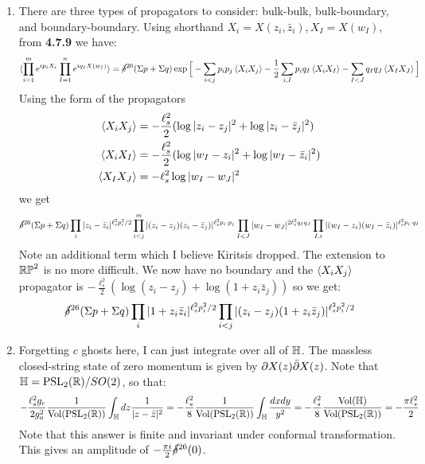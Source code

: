 \documentclass[11pt, class=article, crop=false]{standalone}
\begin{document}
\begin{enumerate}
	\item There are three types of propagators to consider: bulk-bulk, bulk-boundary, and boundary-boundary. Using shorthand $X_i = X(z_i, \bar z_i), X_I = X(w_I)$, from \textbf{4.7.9} we have:
	\[
	\begin{aligned}
		\braket{\prod_{i=1}^m e^{i p_i X_i} \prod_{I=1}^n e^{i q_I X(w_I)}} &= \cancel\delta^{26} (\Sigma p + \Sigma q) \exp\Big[- \sum_{i<j} p_i p_j \braket{X_i X_j} - \frac12 \sum_{i, I} p_i q_I \braket{X_i X_I} - \sum_{I<J} q_I q_J \braket{X_I X_J} \Big]\\
	\end{aligned}
	\]
	Using the form of the propagators 
	\[
		\begin{aligned}
			\braket{X_i X_j} &= -\frac{\ell_s^2}{2} (\log |z_i - z_j|^2 + \log |z_i - \bar z_j|^2 )\\
			\braket{X_i X_I} &=  -\frac{\ell_s^2}{2} (\log |w_I-z_i|^2 + \log |w_I-\bar z_i|^2)\\
			\braket{X_I X_J} &= -\ell_s^2 \log|w_I-w_J|^2
		\end{aligned}
	\]
	we get
	\[
		\cancel\delta^{26} (\Sigma p + \Sigma q) \prod_{i} |z_i - \bar z_i|^{\ell_s^2 p_i^2/2} \prod_{i<j}^m |(z_i - z_j) (z_i - \bar z_j)|^{\ell_s^2 p_i \cdot p_j} \prod_{I<J} |w_I - w_J|^{2 \ell_s^2 q_I q_J} \prod_{I, i} |(w_I - z_i) (w_I- \bar z_i)|^{\ell_s^2 p_i \cdot q_I}
	\]
	Note an additional term which I believe Kiritsis dropped. The extension to $\mathbb{RP}^2$ is no more difficult. We now have no boundary and the $\braket{X_i X_j}$ propagator is $-\frac{\ell_s^2}{2} (\log(z_i - z_j) + \log(1+z_i \bar z_j))$ so we get:
	\[
		\cancel\delta^{26} (\Sigma p + \Sigma q) \prod_{i} |1 + z_i \bar z_i|^{\ell_s^2 p_i^2/2} \prod_{i < j} |(z_i - z_j) (1 + z_i \bar z_j)|^{\ell_s^2 p_i^2/2}
	\]
	
	\item Forgetting $c$ ghosts here, I can just integrate over all of $\mathbb{H}$. The massless closed-string state of zero momentum is given by $\partial X(z) \bar {\partial} X(z)$. Note that $\mathbb{H} = \mathrm{PSL}_2(\mathbb{R}) / SO(2)$, so that:
	\[
		-\frac{\ell_s^2 g_c}{2 g_o^2} \frac{1}{\mathrm{Vol}(\mathrm{PSL}_2(\mathbb{R}))} \int_{\mathbb{H}} dz \frac{1}{|z - \bar z|^2}
		 = -\frac{\ell_s^2}{8} \frac{1}{\mathrm{Vol}(\mathrm{PSL}_2(\mathbb{R}))} \int_{\mathbb{H}} \frac{dx dy}{y^2} = -\frac{\ell_s^2}{8} \frac{\mathrm{Vol}(\mathbb{H})}{\mathrm{Vol}(\mathrm{PSL}_2(\mathbb{R}))} = -\frac{\pi \ell_s^2}{2}
	\]
	 Note that this answer is finite and invariant under conformal transformation. This gives an amplitude of $-\frac{\pi i}{2} \cancel\delta^{26}(0)$. 
	

\end{enumerate}
\end{document}
